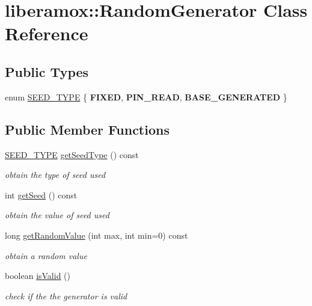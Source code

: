 \hypertarget{classliberamox_1_1RandomGenerator}{}\section{liberamox\+:\+:Random\+Generator Class Reference}
\label{classliberamox_1_1RandomGenerator}
\subsection*{Public Types}
\begin{DoxyCompactItemize}
\item 
enum \hyperlink{classliberamox_1_1RandomGenerator_ab60a70e0f015b364e905607690cac2d6}{S\+E\+E\+D\+\_\+\+T\+Y\+PE} \{ {\bfseries F\+I\+X\+ED}, 
{\bfseries P\+I\+N\+\_\+\+R\+E\+AD}, 
{\bfseries B\+A\+S\+E\+\_\+\+G\+E\+N\+E\+R\+A\+T\+ED}
 \}
\end{DoxyCompactItemize}
\subsection*{Public Member Functions}
\begin{DoxyCompactItemize}
\item 
\hyperlink{classliberamox_1_1RandomGenerator_ab60a70e0f015b364e905607690cac2d6}{S\+E\+E\+D\+\_\+\+T\+Y\+PE} \hyperlink{classliberamox_1_1RandomGenerator_ab95f5e54da75bee458656c6c9d85033b}{get\+Seed\+Type} () const 
\begin{DoxyCompactList}\small\item\em obtain the type of seed used \end{DoxyCompactList}\item 
int \hyperlink{classliberamox_1_1RandomGenerator_afed1946628cd976de767ee2b19f5c53f}{get\+Seed} () const 
\begin{DoxyCompactList}\small\item\em obtain the value of seed used \end{DoxyCompactList}\item 
long \hyperlink{classliberamox_1_1RandomGenerator_a97e753a5f24b4be9b83e06ace496f62b}{get\+Random\+Value} (int max, int min=0) const 
\begin{DoxyCompactList}\small\item\em obtain a random value \end{DoxyCompactList}\item 
boolean \hyperlink{classliberamox_1_1RandomGenerator_acd18f3d3bcdf73afb320858ab6110588}{is\+Valid} ()
\begin{DoxyCompactList}\small\item\em check if the the generator is valid \end{DoxyCompactList}\end{DoxyCompactItemize}
